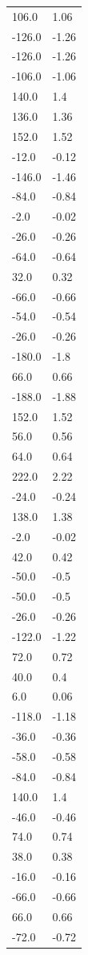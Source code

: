 \begin{longtable}{ll}
106.0 & 1.06 \\
-126.0 & -1.26 \\
-126.0 & -1.26 \\
-106.0 & -1.06 \\
140.0 & 1.4 \\
136.0 & 1.36 \\
152.0 & 1.52 \\
-12.0 & -0.12 \\
-146.0 & -1.46 \\
-84.0 & -0.84 \\
-2.0 & -0.02 \\
-26.0 & -0.26 \\
-64.0 & -0.64 \\
32.0 & 0.32 \\
-66.0 & -0.66 \\
-54.0 & -0.54 \\
-26.0 & -0.26 \\
-180.0 & -1.8 \\
66.0 & 0.66 \\
-188.0 & -1.88 \\
152.0 & 1.52 \\
56.0 & 0.56 \\
64.0 & 0.64 \\
222.0 & 2.22 \\
-24.0 & -0.24 \\
138.0 & 1.38 \\
-2.0 & -0.02 \\
42.0 & 0.42 \\
-50.0 & -0.5 \\
-50.0 & -0.5 \\
-26.0 & -0.26 \\
-122.0 & -1.22 \\
72.0 & 0.72 \\
40.0 & 0.4 \\
6.0 & 0.06 \\
-118.0 & -1.18 \\
-36.0 & -0.36 \\
-58.0 & -0.58 \\
-84.0 & -0.84 \\
140.0 & 1.4 \\
-46.0 & -0.46 \\
74.0 & 0.74 \\
38.0 & 0.38 \\
-16.0 & -0.16 \\
-66.0 & -0.66 \\
66.0 & 0.66 \\
-72.0 & -0.72 \\

\end{longtable}
